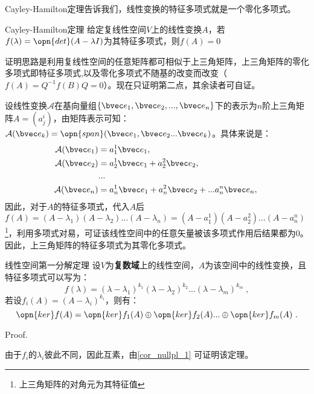 Cayley-Hamilton定理告诉我们，线性变换的特征多项式就是一个零化多项式。
\begin{theorem}{Cayley-Hamilton定理}
给定复线性空间$V$上的线性变换$A$，若$f(\lambda)=\opn{det}(A-\lambda I)$为其特征多项式，则$f(A)=0$
\end{theorem}
证明思路是利用复线性空间的任意矩阵都可相似于上三角矩阵，上三角矩阵的零化多项式即特征多项式,以及零化多项式不随基的改变而改变（$f(A)=Q^{-1}f(B)Q=0$）。现在只证明第二点，其余读者可自证。

设线性变换$\mathcal A$在基向量组$\{\bvec e_1,\bvec e_2,...,\bvec e_n\}$下的表示为$n$阶上三角矩阵$A=(a^i_j)$，由矩阵表示可知：$\mathcal A(\bvec e_k)=\opn{span}(\bvec e_1,\bvec e_2...\bvec e_k)$。具体来说是：
\begin{equation}
\begin{aligned}
\mathcal A(\bvec e_1)&=a^1_1 \bvec e_1,\\
\mathcal A(\bvec e_2)&=a^1_2 \bvec e_1+a^2_2\bvec e_2,\\
&...\\
\mathcal A(\bvec e_n)&=a^1_n \bvec e_1+a^2_n\bvec e_2+...a^n_n\bvec e_n,\\
\end{aligned}~
\end{equation}
因此，对于$A$的特征多项式，代入$A$后$f(A)=(A-\lambda_1)(A-\lambda_2)...(A-\lambda_n)=(A-a^1_1)(A-a^2_2)...(A-a^n_n)$\footnote{上三角矩阵的对角元为其特征值}，利用多项式对易，可证该线性空间中的任意矢量被该多项式作用后结果都为$0$。因此，上三角矩阵的特征多项式为其零化多项式。
\begin{theorem}{线性空间第一分解定理}
设$V$为\textbf{复数域}上的线性空间，$A$为该空间中的线性变换，且特征多项式可以写为：
\begin{equation}
f(\lambda)=(\lambda-\lambda_1)^{k_1}(\lambda-\lambda_2)^{k_2}...(\lambda-\lambda_m)^{k_m}~,
\end{equation}
若设$f_i(A)=(A-\lambda_i)^{k_i}$，则有：
\begin{equation}
\opn{ker}f(A)=\opn{ker}f_1(A)\oplus\opn{ker}f_2(A)...\oplus\opn{ker}f_m(A)~.
\end{equation}
\end{theorem}
Proof.

由于$f_i$的$\lambda_i$彼此不同，因此互素，由\autoref{cor_nullpl_1} 可证明该定理。